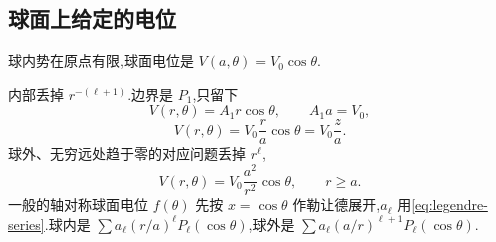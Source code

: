 \subsection{球面上给定的电位}

\begin{example}
球内势在原点有限,球面电位是 $V(a,\theta)=V_0\cos\theta$.
\end{example}
\begin{solution}
内部丢掉 $r^{-(\ell+1)}$.边界是 $P_1$,只留下
\begin{equation}
  V(r,\theta)=A_1 r\cos\theta,
  \qquad A_1 a=V_0,
\end{equation}
\begin{equation}
  V(r,\theta)=V_0\frac{r}{a}\cos\theta=V_0\frac{z}{a}.
\end{equation}
球外、无穷远处趋于零的对应问题丢掉 $r^{\ell}$,
\begin{equation}
  V(r,\theta)=V_0\frac{a^2}{r^2}\cos\theta,
  \qquad r\geq a.
\end{equation}
一般的轴对称球面电位 $f(\theta)$ 先按 $x=\cos\theta$ 作勒让德展开,$a_{\ell}$ 用\eqref{eq:legendre-series}.球内是 $\sum a_{\ell}(r/a)^{\ell} P_{\ell}(\cos\theta)$,球外是 $\sum a_{\ell}(a/r)^{\ell+1} P_{\ell}(\cos\theta)$.
\end{solution}
